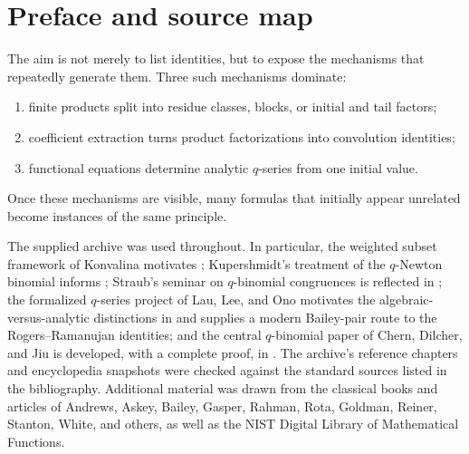 \documentclass[11pt,oneside,openany]{book}
\theoremstyle{definition}
\theoremstyle{remark}
\begin{document}
\chapter*{Preface and source map}
The aim is not merely to list identities, but to expose the mechanisms that repeatedly generate them.  Three such mechanisms dominate:
\begin{enumerate}
\item finite products split into residue classes, blocks, or initial and tail factors;
\item coefficient extraction turns product factorizations into convolution identities;
\item functional equations determine analytic $q$-series from one initial value.
\end{enumerate}
Once these mechanisms are visible, many formulas that initially appear unrelated become instances of the same principle.

The supplied archive was used throughout.  In particular, the weighted subset framework of Konvalina motivates ; Kupershmidt's treatment of the $q$-Newton binomial informs ; Straub's seminar on $q$-binomial congruences is reflected in ; the formalized $q$-series project of Lau, Lee, and Ono motivates the algebraic-versus-analytic distinctions in  and supplies a modern Bailey-pair route to the Rogers--Ramanujan identities; and the central $q$-binomial paper of Chern, Dilcher, and Jiu is developed, with a complete proof, in .  The archive's reference chapters and encyclopedia snapshots were checked against the standard sources listed in the bibliography.  Additional material was drawn from the classical books and articles of Andrews, Askey, Bailey, Gasper, Rahman, Rota, Goldman, Reiner, Stanton, White, and others, as well as the NIST Digital Library of Mathematical Functions.
\end{document}
